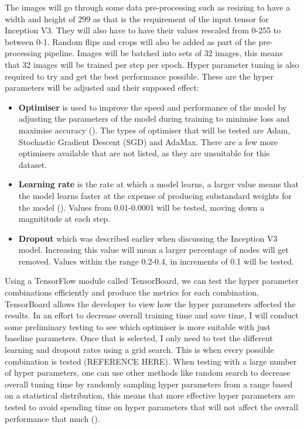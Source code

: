 \documentclass{article}
\begin{document}
The images will go through some data pre-processing such as resizing to have a width and height of 299 as that is the 
requirement of the input tensor for Inception V3. They will also have to have their values rescaled from 0-255 to 
between 0-1. Random flips and crops will also be added as part of the pre-processing pipeline. Images will be batched 
into sets of 32 images, this means that 32 images will be trained per step per epoch. Hyper parameter tuning is also 
required to try and get the best performance possible. These are the hyper parameters will be adjusted and
their supposed effect:

\begin{itemize}
    \item \textbf{Optimiser} is used to improve the speed and performance of the model by adjusting the parameters of the 
    model during training to minimise loss and maximise accuracy (\cite{maithani}). The types of optimiser that will be
    tested are Adam, Stochastic Gradient Descent (SGD) and AdaMax. There are a few more optimisers 
    available that are not listed, as they are unsuitable for this dataset.
    \item \textbf{Learning rate} is the rate at which a model learns, a larger value means that the model learns faster 
    at the expense of producing substandard weights for the model (\cite{andreaperlato}). Values from 0.01-0.0001 will
    be tested, moving down a magnititude at each step. 
    \item \textbf{Dropout} which was described earlier when discussing the Inception V3 model. Increasing this value 
    will mean a larger percentage of nodes will get removed. Values within the range 0.2-0.4, in increments of 0.1 
    will be tested.
\end{itemize}

Using a TensorFlow module called TensorBoard, we can test the hyper parameter combinations efficiently and produce the 
metrics for each combination. TensorBoard allows the developer to view how the hyper parameters affected the results. 
In an effort to decrease overall training time and save time, I will conduct some preliminary testing to see which 
optimiser is more suitable with just baseline parameters. Once that is selected, I only need to test the different 
learning and dropout rates using a grid search. This is when every possible combination is tested (REFERENCE HERE). 
When testing with a 
large number of hyper parameters, one can use other methods like random search to decrease overall tuning time by 
randomly sampling hyper parameters from a range based on a statistical distribution, this means that more effective 
hyper parameters are tested to avoid spending time on hyper parameters that will not affect the overall performance that
much (\cite{sayak}). 
\end{document}
